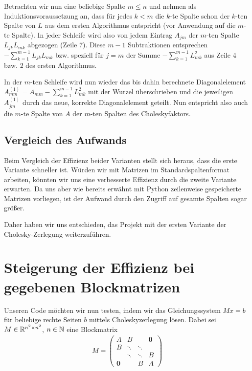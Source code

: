 Betrachten wir nun eine beliebige Spalte $m \leq n$ und nehmen als Induktionsvoraussetzung an, dass für jedes $k < m$ die $k$-te Spalte schon der $k$-ten Spalte von $L$ aus dem ersten Algorithmus entspricht (vor Anwendung auf die $m$-te Spalte). In jeder Schleife wird also von jedem Eintrag $A_{jm}$ der $m$-ten Spalte $L_{jk}L_{mk}$ abgezogen (Zeile 7). Diese $m-1$ Subtraktionen entsprechen $-\sum_{k=1}^{m-1}L_{jk}L_{mk}$ bzw. speziell für $j=m$ der Summe $-\sum_{k=1}^{m-1}L_{mk}^{2}$ aus Zeile 4 bzw. 2 des ersten Algorithmus.

In der $m$-ten Schleife wird nun wieder das bis dahin berechnete Diagonalelement $A_{mm}^{(1)} = A_{mm}-\sum_{k=1}^{m-1}L_{mk}^{2}$ mit der Wurzel überschrieben und die jeweiligen $A_{jm}^{(1)}$ durch das neue, korrekte Diagonalelement geteilt. Nun entspricht also auch die $m$-te Spalte von $A$ der $m$-ten Spalten des Choleskyfaktors.


\subsection{Vergleich des Aufwands}
Beim Vergleich der Effizienz beider Varianten stellt sich heraus, dass die erste Variante schneller ist. Würden wir mit Matrizen im Standardspaltenformat arbeiten, könnten wir uns eine verbesserte Effizienz durch die zweite Variante erwarten. Da uns aber wie bereits erwähnt mit Python zeilenweise gespeicherte Matrizen vorliegen, ist der Aufwand durch den Zugriff auf gesamte Spalten sogar größer.

Daher haben wir uns entschieden, das Projekt mit der ersten Variante der Cholesky-Zerlegung weiterzuführen.

\section{Steigerung der Effizienz bei gegebenen Blockmatrizen}

Unseren Code möchten wir nun testen, indem wir das Gleichungssystem $Mx=b$ für beliebige rechte Seiten $b$ mittels Choleskyzerlegung lösen. Dabei sei $M \in \mathbb{R}^{n^{2} \times n^{2}}$, $n \in \mathbb{N}$ eine Blockmatrix
\begin{align*}
    M = \left(\begin{array}{cccccc}
                A & B && \boldsymbol{0} \\
                B & \ddots & \ddots & \\
                & \ddots & \ddots & B \\
                \boldsymbol{0} && B & A
           \end{array}
     \right)
\end{align*}

